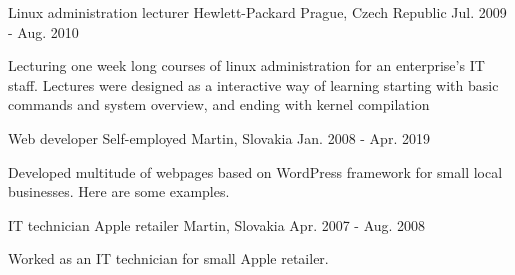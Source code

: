 \begin{cventries}
  \cventry
    {Linux administration lecturer} %
    {Hewlett-Packard} %
    {Prague, Czech Republic} %
    {Jul. 2009 - Aug. 2010} %
    {
      \begin{cvitems} %
        \item {Lecturing one week long courses of linux administration for an enterprise's IT staff. Lectures were designed as a interactive way of learning starting with basic commands and system overview, and ending with kernel compilation}
      \end{cvitems}
    }

    \cventry
    {Web developer} %
    {Self-employed} %
    {Martin, Slovakia} %
    {Jan. 2008 - Apr. 2019} %
    {
      \begin{cvitems} %
        \item {Developed multitude of webpages based on WordPress framework for small local businesses. Here are some examples.}
      \end{cvitems}
    }

  \cventry
    {IT technician} %
    {Apple retailer} %
    {Martin, Slovakia} %
    {Apr. 2007 - Aug. 2008} %
    {
      \begin{cvitems} %
        \item {Worked as an IT technician for small Apple retailer.}
      \end{cvitems}
    }


\end{cventries}

